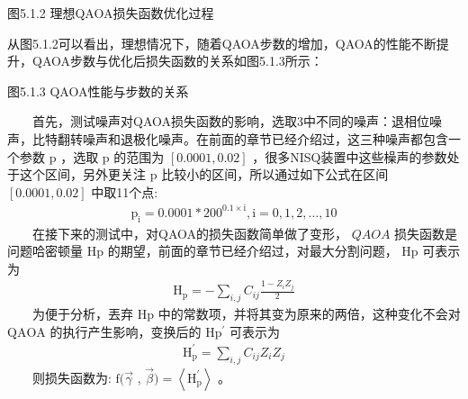 \documentclass[a4paper,11pt,english]{sphinxmanual}
\let\sphinxpxdimen\pdfpxdimen\else\newdimen\sphinxpxdimen
\begin{document}
\begin{center}图5.1.2 理想QAOA损失函数优化过程
\end{center}
\sphinxAtStartPar
从图5.1.2可以看出，理想情况下，随着QAOA步数的增加，QAOA的性能不断提升，QAOA步数与优化后损失函数的关系如图5.1.3所示：

\noindent{\hspace*{\fill}\sphinxincludegraphics[width=400\sphinxpxdimen]{{5.1.3}.png}\hspace*{\fill}}

\begin{center}图5.1.3 QAOA性能与步数的关系
\end{center}
\sphinxAtStartPar
{}

\sphinxAtStartPar
  首先，测试噪声对QAOA损失函数的影响，选取3中不同的噪声：退相位噪声，比特翻转噪声和退极化噪声。在前面的章节已经介绍过，这三种噪声都包含一个参数  \(\mathrm{p}\) ，选取 \(\mathrm{p}\) 的范围为 \([0.0001,0.02]\) ，很多NISQ装置中这些橾声的参数处于这个区间，另外更关注  \(\mathrm{p}\) 比较小的区间，所以通过如下公式在区间 \([0.0001,0.02]\) 中取11个点:
\begin{equation*}
\begin{split}\mathrm{p}_{\mathrm{i}}=0.0001 * 200^{0.1 \times \mathrm{i}}, \mathrm{i}=0,1,2, \ldots, 10\end{split}
\end{equation*}
\sphinxAtStartPar
  在接下来的测试中，对QAOA的损失函数简单做了变形，  \(Q A O A\) 损失函数是问题哈密顿量  \(\mathrm{H}{\mathrm{p}}\) 的期望，前面的章节已经介绍过，对最大分割问题， \(\mathrm{H}{\mathrm{p}}\) 可表示为
\begin{equation*}
\begin{split}\mathrm{H}_{\mathrm{p}}=-\sum_{i, j} C_{i j} \frac{1-Z_{i} Z_{j}}{2}\end{split}
\end{equation*}
\sphinxAtStartPar
  为便于分析，丟弃  \(\mathrm{H}{\mathrm{p}}\) 中的常数项，并将其变为原来的两倍，这种变化不会对 \(\mathrm{QAOA}\) 的执行产生影响，变换后的 \(\mathrm{H}{\mathrm{p}}^{\prime}\) 可表示为
\begin{equation*}
\begin{split}\mathrm{H}_{\mathrm{p}}^{\prime}=\sum_{i, j} C_{i j} Z_{i} Z_{j}\end{split}
\end{equation*}
\sphinxAtStartPar
  则损失函数为:  \(\mathrm{f}(\vec{\gamma}\) , \(\vec{\beta})=\left\langle\mathrm{H}_{\mathrm{p}}^{\prime}\right\rangle\) 。
\end{document}
